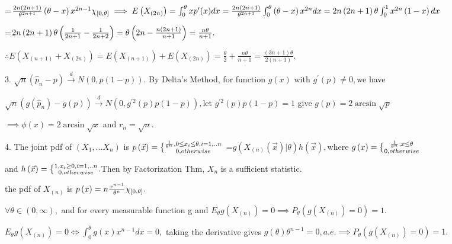 \documentclass{ctexart}
\def\QATOPD#1#2#3#4{{#3 \atopwithdelims#1#2 #4}}%
\begin{document}
=$\frac{2n\left( 2n+1\right) }{\theta ^{2n+1}}\left( \theta -x\right)
x^{2n-1}\chi _{\lbrack 0,\theta ]}\implies E\left( X_{\left( 2n\right)
}\right) =\int_{0}^{\theta }xp^{\prime }(x)dx=\frac{2n\left( 2n+1\right) }{%
\theta ^{2n+1}}\int_{0}^{\theta }\left( \theta -x\right) x^{2n}dx=2n\left(
2n+1\right) \theta \int_{0}^{1}x^{2n}\left( 1-x\right) dx$

=$2n\left( 2n+1\right) \theta \left( \frac{1}{2n+1}-\frac{1}{2n+2}\right)
=\theta \left( 2n-\frac{n\left( 2n+1\right) }{n+1}\right) =\allowbreak \frac{%
n\theta }{n+1}.$

$\therefore E\left( X_{\left( n+1\right) }+X_{\left( 2n\right) }\right)
=E\left( X_{\left( n+1\right) }\right) +E\left( X_{\left( 2n\right) }\right)
=\frac{\theta }{2}+\allowbreak \frac{n\theta }{n+1}=\frac{\left( 3n+1\right)
\theta }{2\left( n+1\right) }.$

3. $\sqrt{n}\left( \hat{p}_{n}-p\right) \overset{d}{\rightarrow }N\left(
0,p\left( 1-p\right) \right) .$ By Delta's Method, for function $g\left(
x\right) $ with $g^{\prime }\left( p\right) \neq 0,$we have

$\sqrt{n}\left( g\left( \hat{p}_{n}\right) -g\left( p\right) \right) \overset%
{d}{\rightarrow }N\left( 0,g^{\prime 2}\left( p\right) p\left( 1-p\right)
\right) ,$let $g^{\prime 2}\left( p\right) p\left( 1-p\right) =1$ give $%
g\left( p\right) =2\arcsin \sqrt{p}$

$\implies \phi \left( x\right) =2\arcsin \sqrt{x}$ and $r_{n}=\sqrt{n}.$

4. The joint pdf of $\left( X_{1},...X_{n}\right) $ is $p\left( \vec{x}%
\right) =\QATOPD\{ . {\frac{1}{\theta ^{n}},0\leq x_{i}\leq \theta
,i=1,..n}{0,otherwise}$ =$g\left( X_{\left( n\right) }\left( \vec{x}\right)
|\theta \right) h\left( \vec{x}\right) ,$where $g\left( x\right) =\QATOPD\{
. {\frac{1}{\theta ^{n}},x\leq \theta }{0,otherwise}$

and $h\left( \vec{x}\right) =\QATOPD\{ . {1,x_{i}\geq
0,i=1,..n}{0.otherwise}.$Then by Factorization Thm, $X_{n}$ is a sufficient
statistic.

the pdf of $X_{\left( n\right) }$ is $p\left( x\right) =n\frac{x^{n-1}}{%
\theta ^{n}}\chi _{\lbrack 0,\theta ]}.$

$\forall \theta \in \left( 0,\infty \right) ,$ and for every measurable
function g and $E_{\theta }g\left( X_{\left( n\right) }\right) =0\implies
P_{\theta }\left( g\left( X_{\left( n\right) }\right) =0\right) =1.$

$E_{\theta }g\left( X_{\left( n\right) }\right) =0\iff \int_{0}^{\theta
}g\left( x\right) x^{n-1}dx=0,$ taking the derivative gives $g\left( \theta
\right) \theta ^{n-1}=0,a.e.\implies P_{\theta }\left( g\left( X_{\left(
n\right) }\right) =0\right) =1.$
\end{document}

